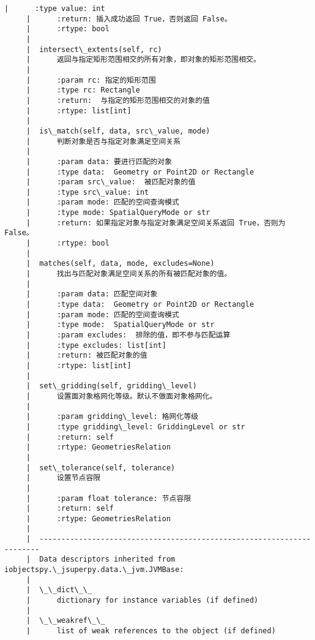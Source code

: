 \documentclass[11pt]{article}
\begin{document}
\begin{Verbatim}[commandchars=\\\{\}]
     |      :type value: int
     |      :return: 插入成功返回 True，否则返回 False。
     |      :rtype: bool
     |  
     |  intersect\_extents(self, rc)
     |      返回与指定矩形范围相交的所有对象，即对象的矩形范围相交。
     |      
     |      :param rc: 指定的矩形范围
     |      :type rc: Rectangle
     |      :return:  与指定的矩形范围相交的对象的值
     |      :rtype: list[int]
     |  
     |  is\_match(self, data, src\_value, mode)
     |      判断对象是否与指定对象满足空间关系
     |      
     |      :param data: 要进行匹配的对象
     |      :type data:  Geometry or Point2D or Rectangle
     |      :param src\_value:  被匹配对象的值
     |      :type src\_value: int
     |      :param mode: 匹配的空间查询模式
     |      :type mode: SpatialQueryMode or str
     |      :return: 如果指定对象与指定对象满足空间关系返回 True，否则为 False。
     |      :rtype: bool
     |  
     |  matches(self, data, mode, excludes=None)
     |      找出与匹配对象满足空间关系的所有被匹配对象的值。
     |      
     |      :param data: 匹配空间对象
     |      :type data:  Geometry or Point2D or Rectangle
     |      :param mode: 匹配的空间查询模式
     |      :type mode:  SpatialQueryMode or str
     |      :param excludes:  排除的值，即不参与匹配运算
     |      :type excludes: list[int]
     |      :return: 被匹配对象的值
     |      :rtype: list[int]
     |  
     |  set\_gridding(self, gridding\_level)
     |      设置面对象格网化等级。默认不做面对象格网化。
     |      
     |      :param gridding\_level: 格网化等级
     |      :type gridding\_level: GriddingLevel or str
     |      :return: self
     |      :rtype: GeometriesRelation
     |  
     |  set\_tolerance(self, tolerance)
     |      设置节点容限
     |      
     |      :param float tolerance: 节点容限
     |      :return: self
     |      :rtype: GeometriesRelation
     |  
     |  ----------------------------------------------------------------------
     |  Data descriptors inherited from iobjectspy.\_jsuperpy.data.\_jvm.JVMBase:
     |  
     |  \_\_dict\_\_
     |      dictionary for instance variables (if defined)
     |  
     |  \_\_weakref\_\_
     |      list of weak references to the object (if defined)
    

\end{Verbatim}
\end{document}
